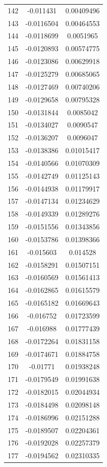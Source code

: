 \documentclass[a4paper, 11pt, oneside]{report}
\begin{document}
{\begin{longtable}{|c|c|c|}
142 & -0.011431  & 0.00409496 \\
143 & -0.0116504 & 0.00464553 \\
144 & -0.0118699 & 0.0051965  \\
145 & -0.0120893 & 0.00574775 \\
146 & -0.0123086 & 0.00629918 \\
147 & -0.0125279 & 0.00685065 \\
148 & -0.0127469 & 0.00740206 \\
149 & -0.0129658 & 0.00795328 \\
150 & -0.0131844 & 0.0085042  \\
151 & -0.0134027 & 0.0090547  \\
152 & -0.0136207 & 0.0096047  \\
153 & -0.0138386 & 0.01015417 \\
154 & -0.0140566 & 0.01070309 \\
155 & -0.0142749 & 0.01125143 \\
156 & -0.0144938 & 0.01179917 \\
157 & -0.0147134 & 0.01234629 \\
158 & -0.0149339 & 0.01289276 \\
159 & -0.0151556 & 0.01343856 \\
160 & -0.0153786 & 0.01398366 \\
161 & -0.015603  & 0.014528   \\
162 & -0.0158291 & 0.01507151 \\
163 & -0.0160569 & 0.01561413 \\
164 & -0.0162865 & 0.01615579 \\
165 & -0.0165182 & 0.01669643 \\
166 & -0.016752  & 0.01723599 \\
167 & -0.016988  & 0.01777439 \\
168 & -0.0172264 & 0.01831158 \\
169 & -0.0174671 & 0.01884758 \\
170 & -0.01771   & 0.01938248 \\
171 & -0.0179549 & 0.01991638 \\
172 & -0.0182015 & 0.02044934 \\
173 & -0.0184498 & 0.02098148 \\
174 & -0.0186996 & 0.02151288 \\
175 & -0.0189507 & 0.02204361 \\
176 & -0.0192028 & 0.02257379 \\
177 & -0.0194562 & 0.02310335 \\

\end{longtable}}
\end{document}
